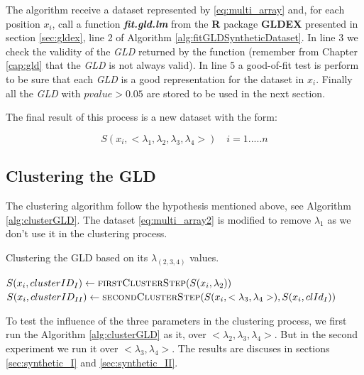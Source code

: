 The algorithm receive a dataset represented by \ref{eq:multi_array} and, for each position $x_{i}$, call a function \textbf{\textit{fit.gld.lm}} from the \textbf{R} package \textbf{GLDEX} presented in section \ref{sec:gldex}, line 2 of Algorithm \ref{alg:fitGLDSyntheticDataset}. In line 3 we check the validity of the \textit{GLD} returned by the function (remember from Chapter \ref{cap:gld} that the \textit{GLD} is not always valid). In line 5 a good-of-fit test is perform to be sure that each \textit{GLD} is a good representation for the dataset in $x_{i}$. Finally all the \textit{GLD} with $pvalue > 0.05$ are stored to be used in the next section.

The final result of this process is a new dataset with the form:

\begin{equation}\label{eq:multi_array2}
S(x_{i}, <\lambda_{1},\lambda_{2},\lambda_{3},\lambda_{4}>) \quad i=1.....n
\end{equation}

\subsection{Clustering the GLD}\label{sub:clustering_gld}

The clustering algorithm follow the hypothesis mentioned above, see Algorithm \ref{alg:clusterGLD}. The dataset \ref{eq:multi_array2} is modified to remove $\lambda_{1}$ as we don't use it in the clustering process. 

\begin{algorithm} 
\caption{Clustering the GLD based on its $\lambda_{(2,3,4)}$ values.}\label{alg:clusterGLD}
\begin{algorithmic}[1] 
\State $S(x_{i}, clusterID_{I}) \gets \Call {firstClusterStep}{S(x_{i},\lambda_{2})}$
\State $S(x_{i}, clusterID_{II}) \gets \Call {secondClusterStep}{S(x_{i},<\lambda_{3},\lambda_{4}>), S(x_{i}, clId_{I})}$
\EndFor
\EndFunction 
\end{algorithmic} 
\end{algorithm} 

To test the influence of the three parameters in the clustering process, we first run the Algorithm \ref{alg:clusterGLD} as it, over $<\lambda_{2},\lambda_{3},\lambda_{4}>$. But in the second experiment we run it over $<\lambda_{3},\lambda_{4}>$. The results are discuses in sections \ref{sec:synthetic_I} and \ref{sec:synthetic_II}.

